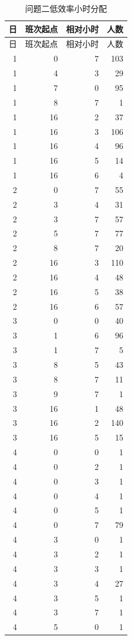 \begin{longtable}{rrrr}
\caption{问题二低效率小时分配}\label{tab:lowhour-detail}\\
\toprule 日 & 班次起点 & 相对小时 & 人数\\\midrule
\endfirsthead\toprule 日 & 班次起点 & 相对小时 & 人数\\\midrule\endhead
1 & 0 & 7 & 103\\
1 & 4 & 3 & 29\\
1 & 7 & 0 & 95\\
1 & 8 & 7 & 1\\
1 & 16 & 2 & 37\\
1 & 16 & 3 & 106\\
1 & 16 & 4 & 96\\
1 & 16 & 5 & 14\\
1 & 16 & 6 & 4\\
2 & 0 & 7 & 55\\
2 & 3 & 4 & 31\\
2 & 3 & 7 & 57\\
2 & 5 & 7 & 77\\
2 & 8 & 7 & 20\\
2 & 16 & 3 & 110\\
2 & 16 & 4 & 48\\
2 & 16 & 5 & 38\\
2 & 16 & 6 & 57\\
3 & 0 & 0 & 40\\
3 & 1 & 6 & 96\\
3 & 1 & 7 & 5\\
3 & 8 & 5 & 43\\
3 & 8 & 7 & 11\\
3 & 9 & 7 & 1\\
3 & 16 & 1 & 48\\
3 & 16 & 2 & 140\\
3 & 16 & 5 & 15\\
4 & 0 & 0 & 1\\
4 & 0 & 2 & 1\\
4 & 0 & 3 & 1\\
4 & 0 & 4 & 1\\
4 & 0 & 5 & 1\\
4 & 0 & 7 & 79\\
4 & 3 & 0 & 1\\
4 & 3 & 2 & 1\\
4 & 3 & 3 & 1\\
4 & 3 & 4 & 27\\
4 & 3 & 5 & 1\\
4 & 3 & 7 & 1\\
4 & 5 & 0 & 1\\

\end{longtable}
